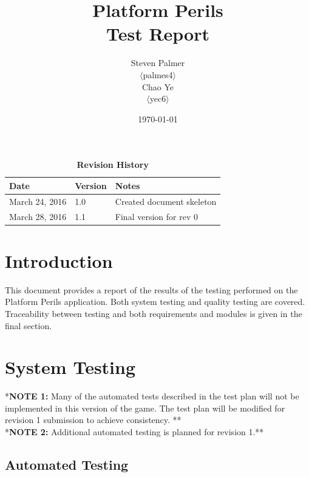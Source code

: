 \documentclass[12pt, titlepage]{article}
\begin{document}
\title{\bf Platform Perils\\[\baselineskip]\Large Test Report}
\author{Steven Palmer\\$\langle$palmes4$\rangle$\\Chao Ye\\$\langle$yec6$\rangle$}
\date{\today}
	
\maketitle

\tableofcontents
\listoftables
\listoffigures


\begin{table}[bp]
\caption*{\bf Revision History}
\begin{tabularx}{\textwidth}{p{3.5cm}p{2cm}X}
\toprule {\bf Date} & {\bf Version} & {\bf Notes}\\
\midrule
March 24, 2016 & 1.0 & Created document skeleton\\
March 28, 2016 & 1.1 & Final version for rev 0\\
\bottomrule
\end{tabularx}
\end{table}

\newpage



\section{Introduction}

This document provides a report of the results of the testing performed on the Platform Perils application.  Both system testing and quality testing are covered. Traceability between testing and both requirements and modules is given in the final section.


\section{System Testing}

\noindent**{\bf NOTE 1:}  Many of the automated tests described in the test plan will not be implemented in this version of the game.  The test plan will be modified for revision 1 submission to achieve consistency. **\\[10pt]
\noindent**{\bf NOTE 2:}  Additional automated testing is planned for revision 1.**



\subsection{Automated Testing}
\end{document}
